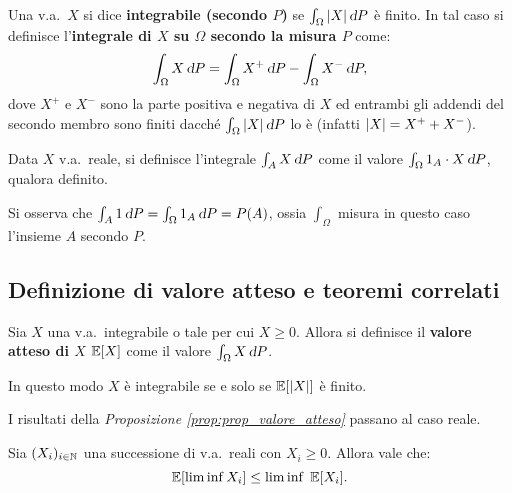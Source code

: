 \begin{multicols*}{2}
\begin{definition}
    Una v.a.~$X$ si dice \textbf{integrabile (secondo $P$)} se
    $\int_\Omega \abs{X} \dP$ è finito. In tal caso si definisce
    l'\textbf{integrale di $X$ su $\Omega$ secondo la misura $P$} come:
    \[
        \int_\Omega X \dP = \int_\Omega X^+ \dP - \int_\Omega X^- \dP,
    \]
    dove $X^+$ e $X^-$ sono la parte positiva e negativa di $X$ ed
    entrambi gli addendi del secondo membro sono finiti dacché
    $\int_\Omega \abs{X} \dP$ lo è (infatti $\left\lvert X \right\rvert = X^+ + X^-$).
\end{definition}

\begin{definition}
    Data $X$ v.a.~reale, si definisce l'integrale $\int_A X \dP$ come il valore
    $\int_\Omega 1_A \cdot X \dP$, qualora definito.
\end{definition}

\begin{remark}
    Si osserva che $\int_A 1 \dP = \int_\Omega 1_A \dP = P(A)$, ossia
    $\int_\Omega$ misura in questo caso l'insieme $A$ secondo $P$.
\end{remark}

\subsection{Definizione di valore atteso e teoremi correlati}

\begin{definition}
    Sia $X$ una v.a.~integrabile o tale per cui $X \geq 0$.
    Allora si definisce il \textbf{valore
    atteso di $X$} $\mathbb{E}[X]$ come il valore $\int_\Omega X \dP$.
\end{definition}

\begin{remark}
    In questo modo $X$ è integrabile se e solo se $\mathbb{E}[\left\lvert X \right\rvert]$ è finito.
\end{remark}

\begin{proposition}
    I risultati della \textit{Proposizione \ref{prop:prop_valore_atteso}} passano
    al caso reale.
\end{proposition}

\begin{lemma}[di Fatou]
    Sia $(X_i)_{i \in \mathbb{N}}$ una successione di v.a.~reali con $X_i \geq 0$. Allora vale che:
    \[
        \mathbb{E}[\liminf X_i] \leq \liminf \; \mathbb{E}[X_i].
    \]


\end{lemma}
\end{multicols*}
